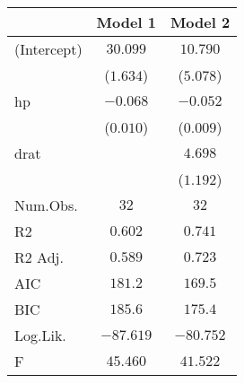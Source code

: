 \begin{table}
\centering
\begin{tabular}[t]{lcc}
\toprule
  & Model 1 & Model 2\\
\midrule
(Intercept) & $30.099$ & $10.790$\\
 & ($1.634$) & ($5.078$)\\
hp & $-0.068$ & $-0.052$\\
 & ($0.010$) & ($0.009$)\\
drat &  & $4.698$\\
 &  & ($1.192$)\\
\midrule
Num.Obs. & $32$ & $32$\\
R2 & $0.602$ & $0.741$\\
R2 Adj. & $0.589$ & $0.723$\\
AIC & $181.2$ & $169.5$\\
BIC & $185.6$ & $175.4$\\
Log.Lik. & $-87.619$ & $-80.752$\\
F & $45.460$ & $41.522$\\
\bottomrule
\end{tabular}
\end{table}
